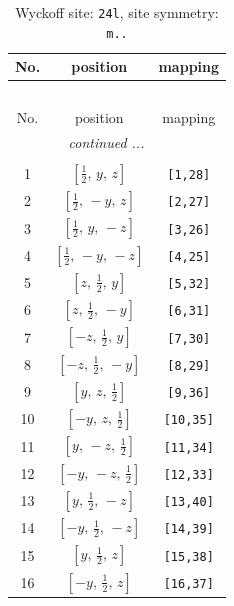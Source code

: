 \documentclass[fleqn,8pt]{jsarticle}
\begin{document}
\renewcommand{\arraystretch}{1.2}
\begin{longtable}{ccc}
\caption{Wyckoff site: {\tt 24l}, site symmetry: {\tt m..}}
 \\
 \hline \hline
No. & position & mapping \\ \hline \endfirsthead

\multicolumn{2}{l}{\tablename\ \thetable{}} \\
 \hline \hline
No. & position & mapping \\ \hline \endhead

 \hline \hline
\multicolumn{2}{r}{\footnotesize\it continued ...} \\ \endfoot

 \hline \hline
\multicolumn{2}{r}{} \\ \endlastfoot

1 & $\left[ \frac{1}{2},\, y,\, z \right]$ & {\tt [1,28]} \\ \hline
2 & $\left[ \frac{1}{2},\, - y,\, z \right]$ & {\tt [2,27]} \\ \hline
3 & $\left[ \frac{1}{2},\, y,\, - z \right]$ & {\tt [3,26]} \\ \hline
4 & $\left[ \frac{1}{2},\, - y,\, - z \right]$ & {\tt [4,25]} \\ \hline
5 & $\left[ z,\, \frac{1}{2},\, y \right]$ & {\tt [5,32]} \\ \hline
6 & $\left[ z,\, \frac{1}{2},\, - y \right]$ & {\tt [6,31]} \\ \hline
7 & $\left[ - z,\, \frac{1}{2},\, y \right]$ & {\tt [7,30]} \\ \hline
8 & $\left[ - z,\, \frac{1}{2},\, - y \right]$ & {\tt [8,29]} \\ \hline
9 & $\left[ y,\, z,\, \frac{1}{2} \right]$ & {\tt [9,36]} \\ \hline
10 & $\left[ - y,\, z,\, \frac{1}{2} \right]$ & {\tt [10,35]} \\ \hline
11 & $\left[ y,\, - z,\, \frac{1}{2} \right]$ & {\tt [11,34]} \\ \hline
12 & $\left[ - y,\, - z,\, \frac{1}{2} \right]$ & {\tt [12,33]} \\ \hline
13 & $\left[ y,\, \frac{1}{2},\, - z \right]$ & {\tt [13,40]} \\ \hline
14 & $\left[ - y,\, \frac{1}{2},\, - z \right]$ & {\tt [14,39]} \\ \hline
15 & $\left[ y,\, \frac{1}{2},\, z \right]$ & {\tt [15,38]} \\ \hline
16 & $\left[ - y,\, \frac{1}{2},\, z \right]$ & {\tt [16,37]} \\ \hline

\end{longtable}
\end{document}
